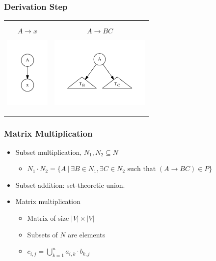 \documentclass[xcolor=table]{beamer}
\begin{document}
\begin{frame}[fragile]
  \transwipe[direction=90]
  \frametitle{Derivation Step}

  \begin{tabular}{p{4cm} p{6cm} }
   \begin{center}
      $$ A \rightarrow x $$      
      
      \includegraphics[height=3.5cm]{pictures/tree1.pdf}
    \end{center}
    &
    \begin{center}
      $$ A \rightarrow B C $$    
    
      \includegraphics[height=3.5cm]{pictures/tree2.pdf}
    \end{center} 
  \end{tabular}

\end{frame}
  
\begin{frame}
  \transwipe[direction=90]
  \frametitle{Matrix Multiplication}
  \begin{itemize}
    \item Subset multiplication, $N_1, N_2 \subseteq N$
    \begin{itemize} 
      \item $N_1 \cdot N_2 = \{A~|~\exists B \in N_1, \exists C \in N_2 \text{ such that }(A \rightarrow B C) \in P\}$
    \end{itemize}
    \item Subset addition: set-theoretic union.
  \end{itemize}

  \begin{itemize}
    \item Matrix multiplication
    \begin{itemize}
      \item Matrix of size $|V| \times |V|$
      \item Subsets of $N$ are elements
      \item $c_{i,j} = \bigcup^{n}_{k=1}{a_{i,k} \cdot b_{k,j}}$
    \end{itemize}
  \end{itemize}
\end{frame}
\end{document}
